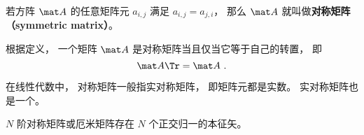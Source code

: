 
\begin{issues}
\issueDraft
{}
\end{issues}


\begin{definition}{}
若方阵 $\mat A$ 的任意矩阵元 $a_{i,j}$ 满足 $a_{i,j} = a_{j,i}$， 那么 $\mat A$ 就叫做\textbf{对称矩阵（symmetric matrix）}。
\end{definition}

根据定义， 一个矩阵 $\mat A$ 是对称矩阵当且仅当它等于自己的转置， 即
\begin{equation}
\mat A\Tr = \mat A~.
\end{equation}

在线性代数中， 对称矩阵一般指实对称矩阵， 即矩阵元都是实数。 实对称矩阵也是一个。

$N$ 阶对称矩阵或厄米矩阵存在 $N$ 个正交归一的本征矢。
